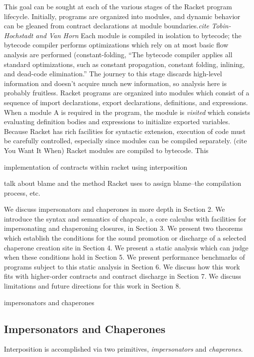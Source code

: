 \documentclass{sigplanconf}
\begin{document}
This goal can be sought at each of the various stages of the Racket program lifecycle.
Initially, programs are organized into modules, and dynamic behavior can be gleaned from contract declarations at module boundaries.\emph{cite Tobin-Hochstadt and Van Horn}
Each module is compiled in isolation to bytecode; the bytecode compiler performs optimizations which rely on at most basic flow analysis are performed (constant-folding, 
``The bytecode compiler applies all standard optimizations, such as constant propagation, constant folding, inlining, and dead-code elimination.''
The journey to this stage discards high-level information and doesn't acquire much new information, so analysis here is probably fruitless.
Racket programs are organized into modules which consist of a sequence of import declarations, export declarations, definitions, and expressions.
When a module A is required in the program, the module is \emph{visited} which consists evaluating definition bodies and expressions to initialize exported variables.
Because Racket has rich facilities for syntactic extension, execution of code must be carefully controlled, especially since modules can be compiled separately.
(cite You Want It When)
Racket modules are compiled to bytecode. This

implementation of contracts within racket using interposition

talk about blame and the method Racket uses to assign blame--the compilation process, etc.

We discuss impersonators and chaperones in more depth in Section 2. We introduce the syntax and semantics of chapcalc, a core calculus with facilities for impersonating and chaperoning closures, in Section 3. We present two theorems which establish the conditions for the sound promotion or discharge of a selected chaperone creation site in Section 4. We present a static analysis which can judge when these conditions hold in Section 5. We present performance benchmarks of programs subject to this static analysis in Section 6. We discuss how this work fits with higher-order contracts and contract discharge in Section 7. We discuss limitations and future directions for this work in Section 8.

impersonators and chaperones

\subsection{Impersonators and Chaperones}

Interposition is accomplished via two primitives, \emph{impersonators} and \emph{chaperones}.
\end{document}
